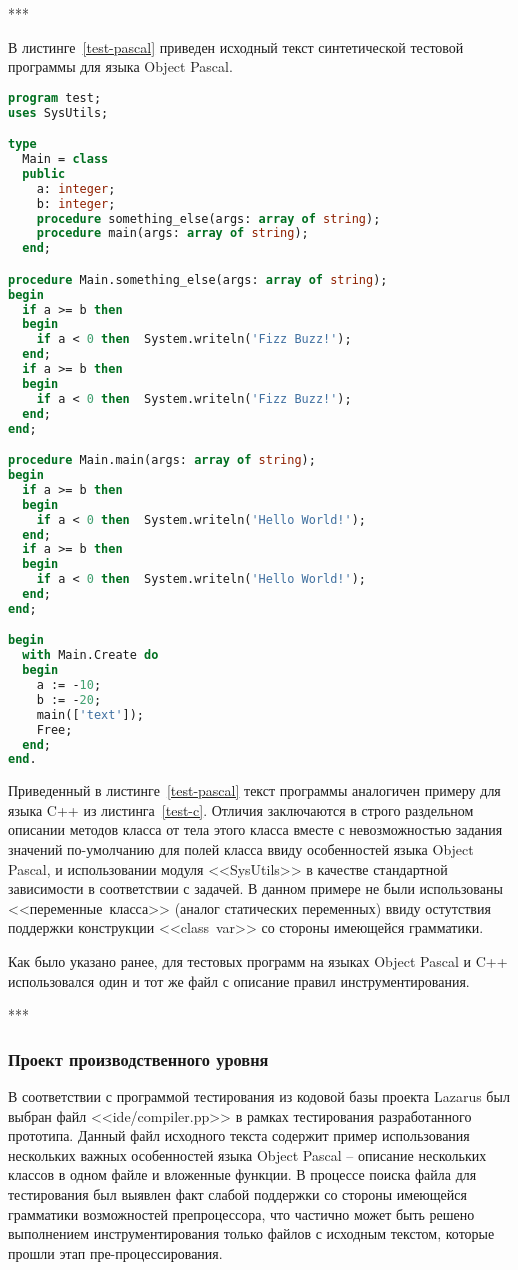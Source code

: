 ***

В листинге~\ref{test-pascal} приведен исходный текст синтетической тестовой программы для языка Object Pascal.

\begin{lstlisting}[frame=single, language=Pascal, label={test-pascal}, caption={Исходный текст тестового приложения.}]
program test;
uses SysUtils;

type
  Main = class
  public
    a: integer;
    b: integer;
    procedure something_else(args: array of string);
    procedure main(args: array of string);
  end;

procedure Main.something_else(args: array of string);
begin
  if a >= b then
  begin
    if a < 0 then  System.writeln('Fizz Buzz!');
  end;
  if a >= b then
  begin
    if a < 0 then  System.writeln('Fizz Buzz!');
  end;
end;

procedure Main.main(args: array of string);
begin
  if a >= b then
  begin
    if a < 0 then  System.writeln('Hello World!');
  end;
  if a >= b then
  begin
    if a < 0 then  System.writeln('Hello World!');
  end;
end;

begin
  with Main.Create do
  begin
    a := -10;
    b := -20;
    main(['text']);
    Free;
  end;
end.
\end{lstlisting}

Приведенный в листинге~\ref{test-pascal} текст программы аналогичен примеру для языка C++ из листинга~\ref{test-c}.
Отличия заключаются в строго раздельном описании методов класса от тела этого класса вместе с невозможностью задания значений по-умолчанию для полей класса ввиду особенностей языка Object Pascal, и использовании модуля <<SysUtils>> в качестве стандартной зависимости в соответствии с задачей.
В данном примере не были использованы <<переменные~класса>> (аналог статических переменных) ввиду остутствия поддержки конструкции <<class~var>> со стороны имеющейся грамматики.

Как было указано ранее, для тестовых программ на языках Object Pascal и C++ использовался один и тот же файл с описание правил инструментирования.

***

\subsubsection{Проект производственного уровня}

В соответствии с программой тестирования из кодовой базы проекта Lazarus был выбран файл <<ide/compiler.pp>> в рамках тестирования разработанного прототипа.
Данный файл исходного текста содержит пример использования нескольких важных особенностей языка Object Pascal -- описание нескольких классов в одном файле и вложенные функции.
В процессе поиска файла для тестирования был выявлен факт слабой поддержки со стороны имеющейся грамматики возможностей препроцессора, что частично может быть решено выполнением инструментирования только файлов с исходным текстом, которые прошли этап пре-процессирования.

